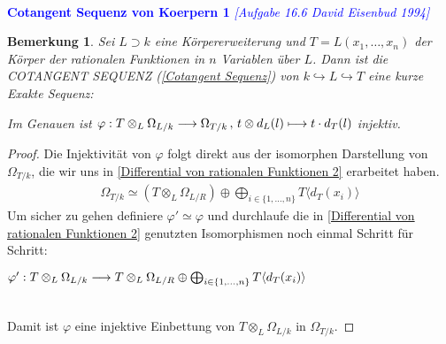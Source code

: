 \documentclass[10pt,a4paper]{report}
\newcommand{\ModulsOfDifferenzials}{David Eisenbud 1994}
\newcounter{Aussage}[chapter]
\newtheorem{bem}[Aussage]{Bemerkung}
\newcommand{\functionfront}[3]{\nolinebreak{#1:#2 \longrightarrow #3}}
\newcommand{\function}[5]{\nolinebreak{#1:#2 \longrightarrow #3 \, , \, #4 \longmapsto #5}}
\newcommand{\divR}[2]{\Omega_{#1/#2}}
\newcommand{\divf}[1]{d_{#1}}
\newcommand{\Tensor}[3]{#1 \otimes_{#2} #3}
\newcommand{\tensor}[3]{#1 \otimes #3}
\newcommand{\Verz}[1]{\langle #1 \rangle}
\begin{document}
\ \\
\textcolor{blue}{\textbf{Cotangent Sequenz von Koerpern 1} \textit{[Aufgabe 16.6 \ModulsOfDifferenzials]}}
\begin{bem}\label{Cotangent Sequenz von Koerpern 1}
Sei $L \supset k$ eine Körpererweiterung und $T = L(x_1, \dots ,x_n)$ der Körper der rationalen Funktionen in $n$ Variablen über $L$. Dann ist die COTANGENT SEQUENZ \textit{(\cref{Cotangent Sequenz})} von $k \hookrightarrow L \hookrightarrow T$ eine kurze Exakte Sequenz:
\begin{center}
\end{center}
Im Genauen ist $\function{\varphi}{\Tensor{T}{L}{\divR{L}{k}}}{\divR{T}{k}}{\tensor{t}{L}{\divf{L}(l)}}{t \cdot \divf{T}(l)}$ injektiv.
\end{bem}
\begin{proof}
Die Injektivität von $\varphi$ folgt direkt aus der isomorphen Darstellung von $\divR{T}{k}$, die wir uns in \cref{Differential von rationalen Funktionen 2} erarbeitet haben.
\begin{gather*}
\divR{T}{k} \simeq (\Tensor{T}{L}{\divR{L}{R}}) \oplus \bigoplus_{i \in \lbrace 1,\dots,n \rbrace} T \Verz{\divf{T}(x_i)}
\end{gather*}
Um sicher zu gehen definiere $\varphi' \simeq \varphi$ und durchlaufe die in \cref{Differential von rationalen Funktionen 2} genutzten Isomorphismen noch einmal Schritt für Schritt:
\begin{center}
$\functionfront{\varphi'}{\Tensor{T}{L}{\divR{L}{k}}}{\Tensor{T}{L}{\divR{L}{R}} \oplus \bigoplus_{i \in \lbrace 1,\dots,n \rbrace} T \Verz{\divf{T}(x_i)}}$\\
\ \\
\end{center}
Damit ist $\varphi$ eine injektive Einbettung von $\Tensor{T}{L}{\divR{L}{k}}$ in $\divR{T}{k}$.
\end{proof}
\end{document}
